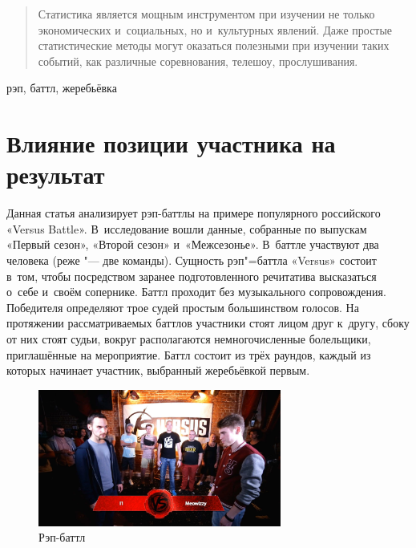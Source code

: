 \documentclass[10pt]{article}
\begin{document}


\DoFirstPageTechnicalStuff

\begin{abstract}
Статистика является мощным инструментом при изучении не только экономических и~социальных, но и~культурных явлений. Даже простые статистические методы могут оказаться полезными при изучении таких событий, как различные соревнования, телешоу, прослушивания.
\end{abstract}

\begin{keyword}
рэп, баттл, жеребьёвка
\end{keyword}



\section{Влияние позиции участника на результат}

Данная статья анализирует рэп-баттлы на примере популярного российского «Versus Battle». В~исследование вошли данные, собранные по выпускам «Первый сезон», «Второй сезон» и~«Межсезонье». В~баттле участвуют два человека (реже "--- две команды). Сущность рэп"=баттла «Versus» состоит в~том, чтобы посредством заранее подготовленного речитатива высказаться о~себе и~своём сопернике. Баттл проходит без музыкального сопровождения. Победителя определяют трое судей простым большинством голосов. На протяжении рассматриваемых баттлов участники стоят лицом друг к~другу, сбоку от них стоят судьи, вокруг располагаются немногочисленные болельщики, приглашённые на мероприятие. Баттл состоит из трёх раундов, каждый из которых начинает участник, выбранный жеребьёвкой первым.

\begin{figure}[htbp]
	\centering
	\includegraphics[width=8cm]{maxresdefault.jpg}
	\caption{Рэп-баттл}
\end{figure}
\end{document}
